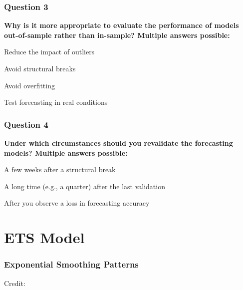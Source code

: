\documentclass{beamer}
\newenvironment{wideenumerate}{\enumerate\addtolength{\itemsep}{10pt}}{\endenumerate}
\begin{document}
\begin{frame}
  \frametitle{Question 3}

  \textbf{Why is it more appropriate to evaluate the performance of models out-of-sample rather than in-sample? Multiple answers possible:}\\
  \bigskip
  
  \begin{wideenumerate}
    \item Reduce the impact of outliers
    \item Avoid structural breaks
    \item Avoid overfitting
    \item Test forecasting in real conditions
  \end{wideenumerate}
\end{frame}


\begin{frame}
  \frametitle{Question 4}

\textbf{Under which circumstances should you revalidate the forecasting models? Multiple answers possible:}\\

  \bigskip

  \begin{wideenumerate}
    \item A few weeks after a structural break
    \item A long time (e.g., a quarter) after the last validation
    \item After you observe a loss in forecasting accuracy
  \end{wideenumerate}
  
\end{frame}


\section{ETS Model}

\begin{frame}
  \frametitle{Exponential Smoothing Patterns}
  \hspace*{15pt}\hbox{\scriptsize Credit:}
\end{frame}
\end{document}
